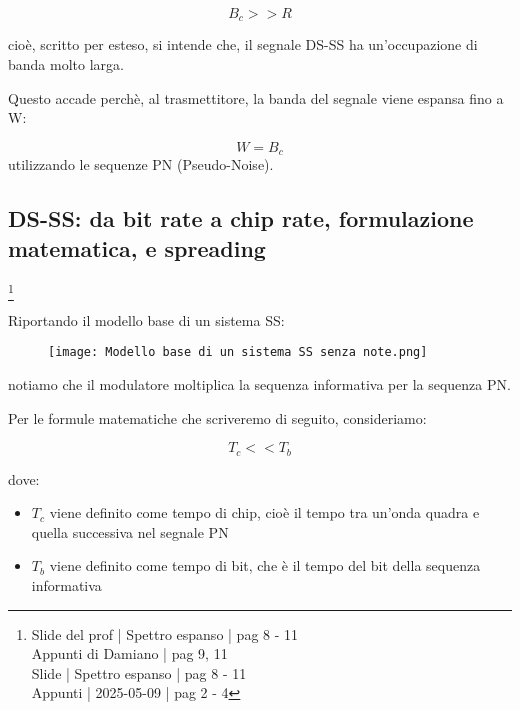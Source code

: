 {
    \Large 
    \begin{equation}
        B_c >> R
    \end{equation}
}

cioè, scritto per esteso, si intende che, il segnale DS-SS ha un'occupazione di banda molto larga. \newline

Questo accade perchè, al trasmettitore, la banda del segnale viene espansa fino a W:

{
    \Large 
    \begin{equation}
        W = B_c
    \end{equation}
}
utilizzando le sequenze PN (Pseudo-Noise). \newline 

\newpage 

\subsection{DS-SS: da bit rate a chip rate, formulazione matematica, e spreading }
\footnote{Slide del prof | Spettro espanso | pag 8 - 11\\
Appunti di Damiano | pag 9, 11 \\
Slide | Spettro espanso | pag 8 - 11\\
Appunti | 2025-05-09 | pag 2 - 4
} 

Riportando il modello base di un sistema SS: 

\begin{figure}[h]
    \centering
    \texttt{[image: Modello base di un sistema SS senza note.png]}
\end{figure}

notiamo che il modulatore moltiplica la sequenza informativa per la sequenza PN. \newline 

Per le formule matematiche che scriveremo di seguito, 
consideriamo: 

{
    \Large 
    \begin{equation}
        T_c << T_b
    \end{equation}
}

dove: 

\begin{itemize}
    \item $T_c$ viene definito come tempo di chip, cioè il tempo tra un'onda quadra e quella successiva nel segnale PN 
    \item $T_b$ viene definito come tempo di bit, che è il tempo del bit della sequenza informativa
\end{itemize}

